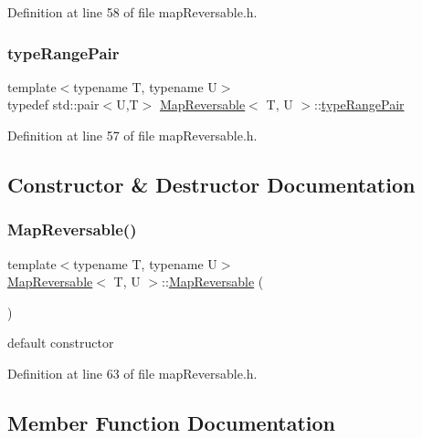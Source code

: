 Definition at line 58 of file map\+Reversable.\+h.

\mbox{\label{classMapReversable_a1e0d482abfd4a66490f667a8fe64be88}} 
\subsubsection{\texorpdfstring{type\+Range\+Pair}{typeRangePair}}
{\footnotesize\ttfamily template$<$typename T, typename U$>$ \\
typedef std\+::pair$<$U,T$>$ \hyperlink{classMapReversable}{Map\+Reversable}$<$ T, U $>$\+::\hyperlink{classMapReversable_a1e0d482abfd4a66490f667a8fe64be88}{type\+Range\+Pair}}



Definition at line 57 of file map\+Reversable.\+h.



\subsection{Constructor \& Destructor Documentation}
\mbox{\label{classMapReversable_a70324d8f15d693e1de7e15a1293ddde2}} 
\subsubsection{\texorpdfstring{Map\+Reversable()}{MapReversable()}}
{\footnotesize\ttfamily template$<$typename T, typename U$>$ \\
\hyperlink{classMapReversable}{Map\+Reversable}$<$ T, U $>$\+::\hyperlink{classMapReversable}{Map\+Reversable} (\begin{DoxyParamCaption}{ }\end{DoxyParamCaption})\hspace{0.3cm}{\ttfamily [inline]}}

default constructor 

Definition at line 63 of file map\+Reversable.\+h.



\subsection{Member Function Documentation}
\mbox{\label{classMapReversable_a2d4fbdc1aae7e5e53cf58c6bea63b450}} 
